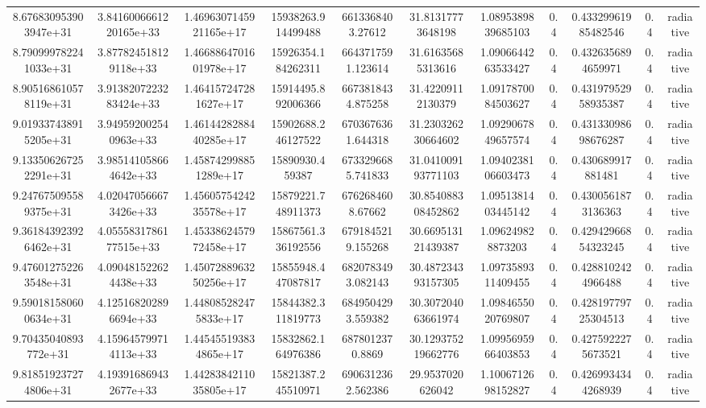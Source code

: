 \begin{table}
\begin{tabular}{ccccccccccc}
8.676830953903947e+31 & 3.8416006661220165e+33 & 1.4696307145921165e+17 & 15938263.914499488 & 6613368403.27612 & 31.81317773648198 & 1.0895389839685103 & 0.4 & 0.43329961985482546 & 0.4 & radiative \\
8.790999782241033e+31 & 3.877824518129118e+33 & 1.4668864701601978e+17 & 15926354.184262311 & 6643717591.123614 & 31.61635685313616 & 1.0906644263533427 & 0.4 & 0.4326356894659971 & 0.4 & radiative \\
8.905168610578119e+31 & 3.9138207223283424e+33 & 1.464157247281627e+17 & 15914495.892006366 & 6673818434.875258 & 31.42209112130379 & 1.0917870084503627 & 0.4 & 0.43197952958935387 & 0.4 & radiative \\
9.019337438915205e+31 & 3.949592002540963e+33 & 1.4614428288440285e+17 & 15902688.246127522 & 6703676361.644318 & 31.230326230664602 & 1.0929067849657574 & 0.4 & 0.43133098698676287 & 0.4 & radiative \\
9.133506267252291e+31 & 3.985141058664642e+33 & 1.458742998851289e+17 & 15890930.459387 & 6733296685.741833 & 31.041009193771103 & 1.0940238106603473 & 0.4 & 0.430689917881481 & 0.4 & radiative \\
9.247675095589375e+31 & 4.020470566673426e+33 & 1.4560575424235578e+17 & 15879221.748911373 & 6762684608.67662 & 30.854088308452862 & 1.0951381403445142 & 0.4 & 0.4300561873136363 & 0.4 & radiative \\
9.361843923926462e+31 & 4.0555831786177515e+33 & 1.4533862457972458e+17 & 15867561.336192556 & 6791845219.155268 & 30.669513121439387 & 1.096249828873203 & 0.4 & 0.42942966854323245 & 0.4 & radiative \\
9.476012752263548e+31 & 4.090481522624438e+33 & 1.4507288963250256e+17 & 15855948.447087817 & 6820783493.082143 & 30.487234393157305 & 1.0973589311409455 & 0.4 & 0.4288102424966488 & 0.4 & radiative \\
9.590181580600634e+31 & 4.125168202896694e+33 & 1.448085282475833e+17 & 15844382.311819773 & 6849504293.559382 & 30.307204063661974 & 1.0984655020769807 & 0.4 & 0.42819779725304513 & 0.4 & radiative \\
9.70435040893772e+31 & 4.159645799714113e+33 & 1.445455193834865e+17 & 15832862.164976386 & 6878012370.8869 & 30.129375219662776 & 1.0995695966403853 & 0.4 & 0.4275922275673521 & 0.4 & radiative \\
9.818519237274806e+31 & 4.193916869432677e+33 & 1.4428384211035805e+17 & 15821387.245510971 & 6906312362.562386 & 29.9537020626042 & 1.1006712698152827 & 0.4 & 0.4269934344268939 & 0.4 & radiative \\

\end{tabular}
\end{table}
